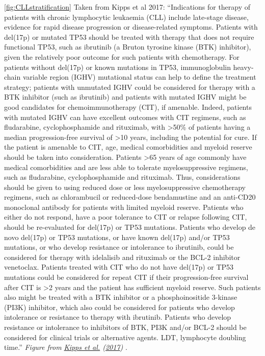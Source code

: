 \documentclass[11pt, a4paper, twosided]{book}
\begin{document}
\ref{fig:CLLstratification} Taken from Kipps et al 2017: ``Indications for therapy of patients with chronic lymphocytic leukaemia (CLL) include late-stage disease, evidence for rapid disease progression or disease-related symptoms. Patients with del(17p) or mutated TP53 should be treated with therapy that does not require functional TP53, such as ibrutinib (a Bruton tyrosine kinase (BTK) inhibitor), given the relatively poor outcome for such patients with chemotherapy. For patients without del(17p) or known mutations in TP53, immunoglobulin heavy-chain variable region (IGHV) mutational status can help to define the treatment strategy; patients with unmutated IGHV could be considered for therapy with a BTK inhibitor (such as ibrutinib) and patients with mutated IGHV might be good candidates for chemoimmunotherapy (CIT), if amenable. Indeed, patients with mutated IGHV can have excellent outcomes with CIT regimens, such as fludarabine, cyclophosphamide and rituximab, with \textgreater50\% of patients having a median progression-free survival of \textgreater10 years, including the potential for cure. If the patient is amenable to CIT, age, medical comorbidities and myeloid reserve should be taken into consideration. Patients \textgreater65 years of age commonly have medical comorbidities and are less able to tolerate myelosuppressive regimens, such as fludarabine, cyclophosphamide and rituximab. Thus, considerations should be given to using reduced dose or less myelosuppressive chemotherapy regimens, such as chlorambucil or reduced-dose bendamustine and an anti-CD20 monoclonal antibody for patients with limited myeloid reserve. Patients who either do not respond, have a poor tolerance to CIT or relapse following CIT, should be re-evaluated for del(17p) or TP53 mutations. Patients who develop de novo del(17p) or TP53 mutations, or have known del(17p) and/or TP53 mutations, or who develop resistance or intolerance to ibrutinib, could be considered for therapy with idelalisib and rituximab or the BCL-2 inhibitor venetoclax. Patients treated with CIT who do not have del(17p) or TP53 mutations could be considered for repeat CIT if their progression-free survival after CIT is \textgreater2 years and the patient has sufficient myeloid reserve. Such patients also might be treated with a BTK inhibitor or a phosphoinositide 3-kinase (PI3K) inhibitor, which also could be considered for patients who develop intolerance or resistance to therapy with ibrutinib. Patients who develop resistance or intolerance to inhibitors of BTK, PI3K and/or BCL-2 should be considered for clinical trials or alternative agents. LDT, lymphocyte doubling time.'' \emph{Figure from \protect\hyperlink{ref-Kipps2017}{Kipps et al.} (\protect\hyperlink{ref-Kipps2017}{2017}) }.
\end{document}
